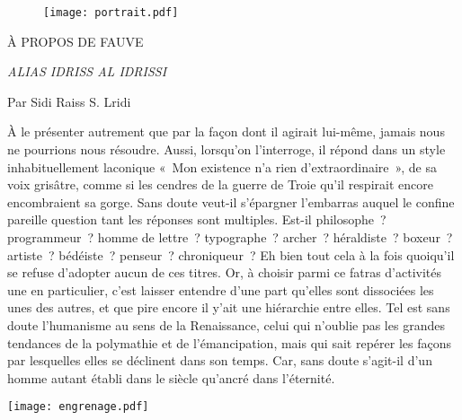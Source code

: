 \newpage
\thispagestyle{empty}
\begin{center}
\begin{figure}[h]
\centering
\texttt{[image: portrait.pdf]}
\captionsetup{labelformat=empty}
\caption[Effigie de Fauve]{}
\end{figure}

\vspace{3pt}

{\Large À PROPOS DE FAUVE}

\vspace{8pt}

  {\em \color{rouge} ALIAS IDRISS AL IDRISSI}

\vspace{8pt}

{\footnotesize Par Sidi Raiss S. Lridi}

\vspace{10pt}
\end{center}

\shapepar{\authorshape} 
À le présenter autrement que par la façon dont il agirait lui-même, jamais nous ne pourrions nous résoudre. Aussi, lorsqu’on l’interroge, il répond dans un style inhabituellement laconique « Mon existence n’a rien d’extraordinaire », de sa voix grisâtre, comme si les cendres de la guerre de Troie qu’il respirait encore encombraient sa gorge. Sans doute veut-il s’épargner l’embarras auquel le confine pareille question tant les réponses sont multiples. Est-il philosophe ? programmeur ? homme de lettre ? typographe ? archer ? héraldiste ? boxeur ? artiste ? bédéiste ? penseur ? chroniqueur ? Eh bien tout cela à la fois quoiqu’il se refuse d’adopter aucun de ces titres. Or, à choisir parmi ce fatras d’activités une en particulier, c’est laisser entendre d’une part qu’elles sont dissociées les unes des autres, et que pire encore il y’ait une hiérarchie entre elles. Tel est sans doute l’humanisme au sens de la Renaissance, celui qui n’oublie pas les grandes tendances de la polymathie et de l’émancipation, mais qui sait repérer les façons par lesquelles elles se déclinent dans son temps.
Car, sans doute s’agit-il d’un homme autant établi dans le siècle qu’ancré dans l’éternité.

\begin{center}
\texttt{[image: engrenage.pdf]}
\end{center}

\restoregeometry
